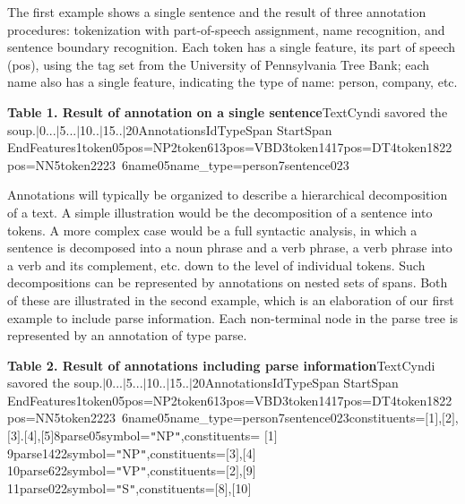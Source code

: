 The first example shows a single sentence and the result of three
annotation procedures: tokenization with part-of-speech assignment, name
recognition, and sentence boundary recognition. Each token has a single
feature, its part of speech (pos), using the tag set from the University of
Pennsylvania Tree Bank; each name also has a single feature, indicating the
type of name: person, company, etc.

{\bf Table 1. Result of annotation on a single sentence}TextCyndi savored the
            soup.\mbox{$|$}0...\mbox{$|$}5...\mbox{$|$}10..\mbox{$|$}15..\mbox{$|$}20AnnotationsIdTypeSpan
            StartSpan
            EndFeatures1token05pos=NP2token613pos=VBD3token1417pos=DT4token1822pos=NN5token2223~6name05name\_type=person7sentence023~

Annotations will typically be organized to describe a hierarchical
      decomposition of a text. A simple illustration would be the decomposition of a
      sentence into tokens. A more complex case would be a full syntactic analysis,
      in which a sentence is decomposed into a noun phrase and a verb phrase, a verb
      phrase into a verb and its complement, etc. down to the level of individual
      tokens. Such decompositions can be represented by annotations on nested sets of
      spans. Both of these are illustrated in the second example, which is an
      elaboration of our first example to include parse information. Each
      non-terminal node in the parse tree is represented by an annotation of type
      parse.

{\bf Table 2. Result of annotations including parse information}TextCyndi savored the
            soup.\mbox{$|$}0...\mbox{$|$}5...\mbox{$|$}10..\mbox{$|$}15..\mbox{$|$}20AnnotationsIdTypeSpan
            StartSpan
            EndFeatures1token05pos=NP2token613pos=VBD3token1417pos=DT4token1822pos=NN5token2223~6name05name\_type=person7sentence023constituents=\mbox{$[$}1\mbox{$]$},\mbox{$[$}2\mbox{$]$},\mbox{$[$}3\mbox{$]$}.\mbox{$[$}4\mbox{$]$},\mbox{$[$}5\mbox{$]$}8parse05symbol={\tt{}"{}}NP{\tt{}"{}},constituents=
            \mbox{$[$}1\mbox{$]$}9parse1422symbol={\tt{}"{}}NP{\tt{}"{}},constituents=\mbox{$[$}3\mbox{$]$},\mbox{$[$}4\mbox{$]$}10parse622symbol={\tt{}"{}}VP{\tt{}"{}},constituents=\mbox{$[$}2\mbox{$]$},\mbox{$[$}9\mbox{$]$}11parse022symbol={\tt{}"{}}S{\tt{}"{}},constituents=\mbox{$[$}8\mbox{$]$},\mbox{$[$}10\mbox{$]$}

